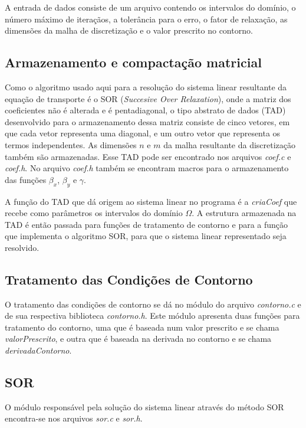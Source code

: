 \documentclass[
	article,			%
	11pt,				%
	oneside,			%
	a4paper,			%
	english,			%
	brazil,				%
	sumario=tradicional
	]{abntex2}
\begin{document}
A entrada de dados consiste de um arquivo contendo os intervalos do domínio, o número máximo de iteraçãos, a tolerância para o erro,
o fator de relaxação, as dimensões da malha de discretização e o valor prescrito no contorno.

\subsection{Armazenamento e compactação matricial}

Como o algoritmo usado aqui para a resolução do sistema linear resultante da equação de transporte é o SOR (\textit{Succesive Over Relaxation}),
onde a matriz dos coeficientes não é alterada e é pentadiagonal, o tipo abstrato de dados (TAD) desenvolvido para o armazenamento dessa matriz
consiste de cinco vetores, em que cada vetor representa uma diagonal, e um outro vetor que representa os termos independentes. As dimensões $n$
e $m$ da malha resultante da discretização também são armazenadas. Esse TAD pode ser encontrado nos arquivos \emph{coef.c} e \emph{coef.h}.
No arquivo \emph{coef.h} também se encontram macros para o armazenamento das funções $\beta_x$, $\beta_y$ e $\gamma$.

A função do TAD que dá origem ao sistema linear no programa é a \emph{criaCoef} que recebe como parâmetros os intervalos do domínio $ \Omega $.
A estrutura armazenada na TAD é então passada para funções de tratamento de contorno e para a função que implementa o algoritmo SOR, para que o
sistema linear representado seja resolvido.

\subsection{Tratamento das Condições de Contorno}

O tratamento das condições de contorno se dá no módulo do arquivo \emph{contorno.c} e de sua respectiva biblioteca \emph{contorno.h}.
Este módulo apresenta duas funções para tratamento do contorno, uma que é baseada num valor prescrito e se chama \emph{valorPrescrito}, e outra
que é baseada na derivada no contorno e se chama \emph{derivadaContorno}.

\subsection{SOR}

O módulo responsável pela solução do sistema linear através do método SOR encontra-se nos arquivos \emph{sor.c} e \emph{sor.h}.
\end{document}
